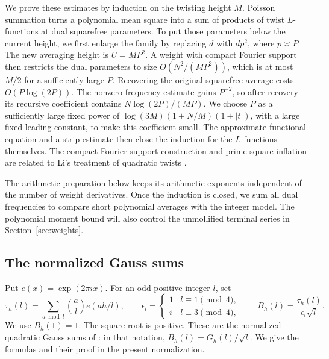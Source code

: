 We prove these estimates by induction on the twisting height $M$.
Poisson summation turns a polynomial mean square into a sum of products
of twist $L$-functions at dual squarefree parameters. To put those
parameters below the current height, we first enlarge the family by
replacing $d$ with $dp^2$, where $p\asymp P$. The new averaging height is
$U=MP^2$. A weight with compact Fourier support then restricts the dual
parameters to size $O(N^2/(MP^2))$, which is at most $M/2$ for a
sufficiently large $P$. Recovering the original squarefree average costs
$O(P\log(2P))$. The nonzero-frequency estimate gains $P^{-2}$, so after
recovery its recursive coefficient contains $N\log(2P)/(MP)$.
We choose $P$ as a sufficiently large fixed power of
$\log(3M)(1+N/M)(1+|t|)$, with a large fixed leading constant, to make
this coefficient small. The approximate functional equation and a strip
estimate then close the induction for the $L$-functions themselves.
The compact Fourier support construction and prime-square inflation
are related to Li's treatment of quadratic twists \cite{Li2022}.

The arithmetic preparation below keeps its arithmetic exponents independent of the
number of weight derivatives. Once the induction is closed, we sum all
dual frequencies to compare short polynomial averages with the integer
model. The polynomial moment bound will also control the unmollified
terminal series in Section~\ref{sec:weights}.

\subsection{The normalized Gauss sums}

Put $e(x)=\exp(2\pi i x)$. For an odd positive integer $l$, set
\[
 \tau_h(l)=\sum_{a\bmod l}\left(\frac a l\right)e(ah/l),\qquad
 \epsilon_l=\begin{cases}1&l\equiv1\pmod4,\\i&l\equiv3\pmod4,\end{cases}
 \qquad B_h(l)=\frac{\tau_h(l)}{\epsilon_l\sqrt l}.
\]
We use $B_h(1)=1$. The square root is positive.
These are the normalized quadratic Gauss sums of
\cite[Section~2.2, Lemma~2.3]{Soundararajan2000}: in that notation,
$B_h(l)=G_h(l)/\sqrt l$. We give the formulas and their proof in the
present normalization.

